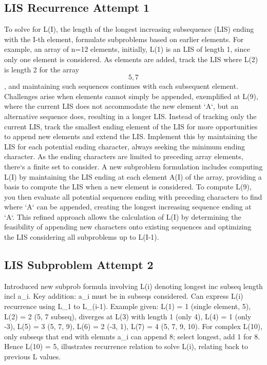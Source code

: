 \subsection*{LIS  Recurrence Attempt 1}
To solve for L(I), the length of the longest increasing subsequence (LIS) ending with the I-th element, formulate subproblems based on earlier elements.
For example, an array of n=12 elements, initially, L(1) is an LIS of length 1, since only one element is considered.
As elements are added, track the LIS where L(2) is length 2 for the array \[5, 7\], and maintaining such sequences continues with each subsequent element.
Challenges arise when elements cannot simply be appended, exemplified at L(9), where the current LIS does not accommodate the new element `A`, but an alternative sequence does, resulting in a longer LIS\@.
Instead of tracking only the current LIS, track the smallest ending element of the LIS for more opportunities to append new elements and extend the LIS\@.
Implement this by maintaining the LIS for each potential ending character, always seeking the minimum ending character.
As the ending characters are limited to preceding array elements, there`s a finite set to consider.
A new subproblem formulation includes computing L(I) by maintaining the LIS ending at each element A(I) of the array, providing a basis to compute the LIS when a new element is considered.
To compute L(9), you then evaluate all potential sequences ending with preceding characters to find where `A` can be appended, creating the longest increasing sequence ending at `A`.
This refined approach allows the calculation of L(I) by determining the feasibility of appending new characters onto existing sequences and optimizing the LIS considering all subproblems up to L(I-1).

\subsection*{LIS  Subproblem Attempt 2}
Introduced new subprob formula involving L(i) denoting longest inc subseq length incl a\_i.
Key addition: a\_i must be in subseqs considered.
Can express L(i) recurrence using L\_1 to L\_(i-1).
Example given: L(1) = 1 (single element, 5), L(2) = 2 (5, 7 subseq), diverges at L(3) with length 1 (only 4), L(4) = 1 (only -3), L(5) = 3 (5, 7, 9), L(6) = 2 (-3, 1), L(7) = 4 (5, 7, 9, 10).
For complex L(10), only subseqs that end with elemnts a\_i can append 8; select longest, add 1 for 8.
Hence L(10) = 5, illustrates recurrence relation to solve L(i), relating back to previous L values.


